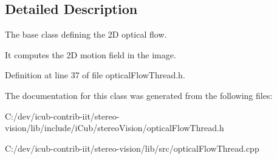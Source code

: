 \subsection{Detailed Description}
The base class defining the 2\+D optical flow. 

It computes the 2\+D motion field in the image. 

Definition at line 37 of file optical\+Flow\+Thread.\+h.



The documentation for this class was generated from the following files\+:\begin{DoxyCompactItemize}
\item 
C\+:/dev/icub-\/contrib-\/iit/stereo-\/vision/lib/include/i\+Cub/stereo\+Vision/optical\+Flow\+Thread.\+h\item 
C\+:/dev/icub-\/contrib-\/iit/stereo-\/vision/lib/src/optical\+Flow\+Thread.\+cpp\end{DoxyCompactItemize}
